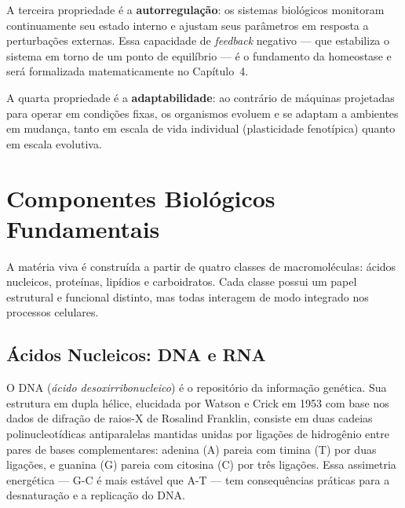 A terceira propriedade é a \textbf{autorregulação}: os sistemas biológicos monitoram
continuamente seu estado interno e ajustam seus parâmetros em resposta a perturbações
externas. Essa capacidade de \emph{feedback} negativo --- que estabiliza o sistema em torno
de um ponto de equilíbrio --- é o fundamento da homeostase e será formalizada matematicamente
no Capítulo~4.

A quarta propriedade é a \textbf{adaptabilidade}: ao contrário de máquinas projetadas para
operar em condições fixas, os organismos evoluem e se adaptam a ambientes em mudança,
tanto em escala de vida individual (plasticidade fenotípica) quanto em escala evolutiva.

\section{Componentes Biológicos Fundamentais}

A matéria viva é construída a partir de quatro classes de macromoléculas: ácidos nucleicos,
proteínas, lipídios e carboidratos. Cada classe possui um papel estrutural e funcional
distinto, mas todas interagem de modo integrado nos processos celulares.

\subsection{Ácidos Nucleicos: DNA e RNA}

O DNA (\emph{ácido desoxirribonucleico}) é o repositório da informação genética. Sua
estrutura em dupla hélice, elucidada por Watson e Crick em 1953 com base nos dados de
difração de raios-X de Rosalind Franklin, consiste em duas cadeias polinucleotídicas
antiparalelas mantidas unidas por ligações de hidrogênio entre pares de bases complementares:
adenina (A) pareia com timina (T) por duas ligações, e guanina (G) pareia com citosina (C)
por três ligações. Essa assimetria energética --- G-C é mais estável que A-T --- tem
consequências práticas para a desnaturação e a replicação do DNA.

